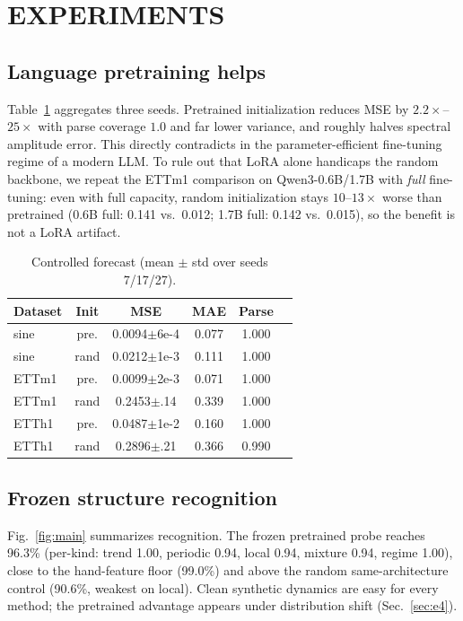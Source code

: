 \documentclass{article}
\begin{document}
\section{EXPERIMENTS}

\subsection{Language pretraining helps}\label{sec:e1}
Table~\ref{tab:forecast} aggregates three seeds.  Pretrained initialization
reduces MSE by $2.2\times$--$25\times$ with parse coverage $1.0$ and far lower
variance, and roughly halves spectral amplitude error.  This directly
contradicts \cite{tan2024useful} in the parameter-efficient fine-tuning regime
of a modern LLM.  To rule out that LoRA alone handicaps the random backbone, we
repeat the ETTm1 comparison on Qwen3-0.6B/1.7B with \emph{full} fine-tuning:
even with full capacity, random initialization stays $10$--$13\times$ worse than
pretrained (0.6B full: 0.141 vs.\ 0.012; 1.7B full: 0.142 vs.\ 0.015), so the
benefit is not a LoRA artifact.

\begin{table}[t]
\caption{Controlled forecast (mean $\pm$ std over seeds 7/17/27).}
\label{tab:forecast}
\centering
\begin{tabular}{lccccc}
\toprule
Dataset & Init & MSE & MAE & Parse\\
\midrule
sine    & pre. & 0.0094$\pm$6e-4 & 0.077 & 1.000\\
sine    & rand & 0.0212$\pm$1e-3 & 0.111 & 1.000\\
ETTm1   & pre. & 0.0099$\pm$2e-3 & 0.071 & 1.000\\
ETTm1   & rand & 0.2453$\pm$.14  & 0.339 & 1.000\\
ETTh1   & pre. & 0.0487$\pm$1e-2 & 0.160 & 1.000\\
ETTh1   & rand & 0.2896$\pm$.21  & 0.366 & 0.990\\
\bottomrule
\end{tabular}
\end{table}

\subsection{Frozen structure recognition}\label{sec:e2}
Fig.~\ref{fig:main} summarizes recognition.  The frozen pretrained probe
reaches 96.3\% (per-kind: trend 1.00, periodic 0.94, local 0.94, mixture 0.94,
regime 1.00), close to the hand-feature floor (99.0\%) and above the random
same-architecture control (90.6\%, weakest on local).  Clean synthetic dynamics
are easy for every method; the pretrained advantage appears under distribution
shift (Sec.~\ref{sec:e4}).
\end{document}
